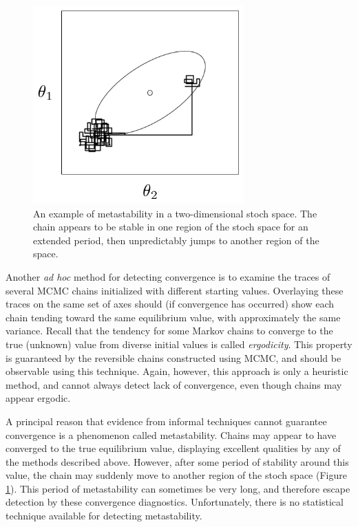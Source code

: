 \begin{figure}[h]
\begin{center}
\includegraphics[height=3in]{metastable.png}
\caption{An example of metastability in a two-dimensional stoch space. The chain appears to be stable in one region of the stoch space for an extended period, then unpredictably jumps to another region of the space.}
\label{fig:metas}
\end{center}
\end{figure}

Another \emph{ad hoc} method for detecting convergence is to examine the traces of several MCMC chains initialized with different starting values. Overlaying these traces on the same set of axes should (if convergence has occurred) show each chain tending toward the same equilibrium value, with approximately the same variance. Recall that the tendency for some Markov chains to converge to the true (unknown) value from diverse initial values is called \emph{ergodicity}. This property is guaranteed by the reversible chains constructed using MCMC, and should be observable using this technique. Again, however, this approach is only a heuristic method, and cannot always detect lack of convergence, even though chains may appear ergodic.

A principal reason that evidence from informal techniques cannot guarantee convergence is a phenomenon called metastability. Chains may appear to have converged to the true equilibrium value, displaying excellent qualities by any of the methods described above. However, after some period of stability around this value, the chain may suddenly move to another region of the stoch space (Figure \ref{fig:metas}). This period of metastability can sometimes be very long, and therefore escape detection by these convergence diagnostics. Unfortunately, there is no statistical technique available for detecting metastability.

